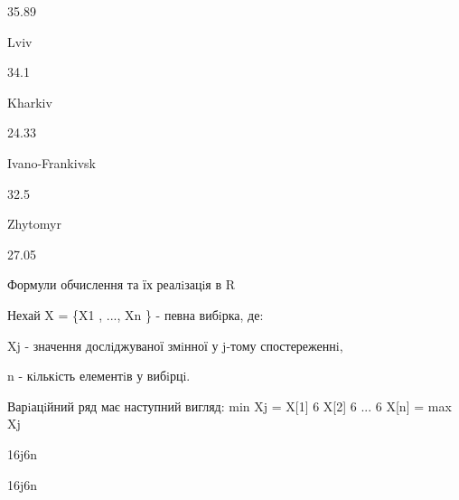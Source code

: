 \documentclass[a4paper,portrait,12pt]{article}
\begin{document}
35.89


\begin{flushleft}
Lviv
\end{flushleft}


34.1


\begin{flushleft}
Kharkiv
\end{flushleft}


24.33


\begin{flushleft}
Ivano-Frankivsk
\end{flushleft}


32.5


\begin{flushleft}
Zhytomyr
\end{flushleft}


27.05





\begin{flushleft}
Формули обчислення та їх реалiзацiя в R
\end{flushleft}





\begin{flushleft}
Нехай X = \{X1 , ..., Xn \} - певна вибiрка, де:
\end{flushleft}


\begin{flushleft}
Xj - значення дослiджуваної змiнної у j-тому спостереженнi,
\end{flushleft}


\begin{flushleft}
n - кiлькiсть елементiв у вибiрцi.
\end{flushleft}


\begin{flushleft}
Варiацiйний ряд має наступний вигляд: min Xj = X[1] 6 X[2] 6 ... 6 X[n] = max Xj
\end{flushleft}


\begin{flushleft}
16j6n
\end{flushleft}





\begin{flushleft}
16j6n
\end{flushleft}
\end{document}
